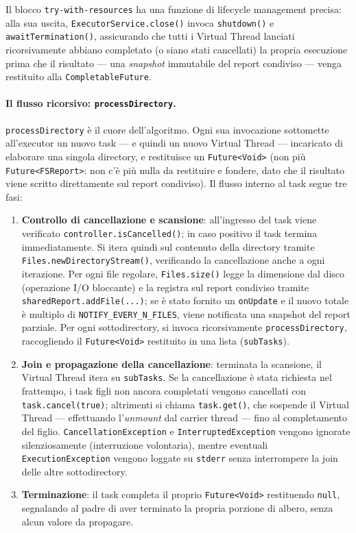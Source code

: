 \documentclass[11pt,a4paper]{article}
\begin{document}
Il blocco \texttt{try-with-resources} ha una funzione di lifecycle management precisa: alla sua uscita, \texttt{ExecutorService.close()} invoca \texttt{shutdown()} e \texttt{awaitTermination()}, assicurando che tutti i Virtual Thread lanciati ricorsivamente abbiano completato (o siano stati cancellati) la propria esecuzione prima che il risultato — una \textit{snapshot} immutabile del report condiviso — venga restituito alla \texttt{CompletableFuture}.

\paragraph{Il flusso ricorsivo: \texttt{processDirectory}.}

\texttt{processDirectory} è il cuore dell'algoritmo. Ogni sua invocazione sottomette all'executor un nuovo task — e quindi un nuovo Virtual Thread — incaricato di elaborare una singola directory, e restituisce un \texttt{Future<Void>} (non più \texttt{Future<FSReport>}: non c'è più nulla da restituire e fondere, dato che il risultato viene scritto direttamente sul report condiviso). Il flusso interno al task segue tre fasi:

\begin{enumerate}
    \item \textbf{Controllo di cancellazione e scansione}: all'ingresso del task viene verificato \texttt{controller.isCancelled()}; in caso positivo il task termina immediatamente. Si itera quindi sul contenuto della directory tramite \texttt{Files.newDirectoryStream()}, verificando la cancellazione anche a ogni iterazione. Per ogni file regolare, \texttt{Files.size()} legge la dimensione dal disco (operazione I/O bloccante) e la registra sul report condiviso tramite \texttt{sharedReport.addFile(...)}; se è stato fornito un \texttt{onUpdate} e il nuovo totale è multiplo di \texttt{NOTIFY\_EVERY\_N\_FILES}, viene notificata una snapshot del report parziale. Per ogni sottodirectory, si invoca ricorsivamente \texttt{processDirectory}, raccogliendo il \texttt{Future<Void>} restituito in una lista (\texttt{subTasks}).

    \item \textbf{Join e propagazione della cancellazione}: terminata la scansione, il Virtual Thread itera su \texttt{subTasks}. Se la cancellazione è stata richiesta nel frattempo, i task figli non ancora completati vengono cancellati con \texttt{task.cancel(true)}; altrimenti si chiama \texttt{task.get()}, che sospende il Virtual Thread — effettuando l'\textit{unmount} dal carrier thread — fino al completamento del figlio. \texttt{CancellationException} e \texttt{InterruptedException} vengono ignorate silenziosamente (interruzione volontaria), mentre eventuali \texttt{ExecutionException} vengono loggate su \texttt{stderr} senza interrompere la join delle altre sottodirectory.

    \item \textbf{Terminazione}: il task completa il proprio \texttt{Future<Void>} restituendo \texttt{null}, segnalando al padre di aver terminato la propria porzione di albero, senza alcun valore da propagare.
\end{enumerate}
\end{document}
